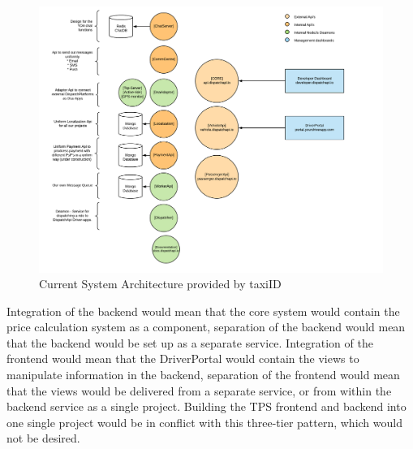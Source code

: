 \begin{figure}[htbp!]
	\centering
	\includegraphics[width=1\textwidth]{Architecture}
	\caption[Architecture]{Current System Architecture provided by taxiID}
	\label{fig:Architecture}
\end{figure}

Integration of the backend would mean that the core system would contain the price calculation system as a component, separation of the backend would mean that the backend would be set up as a separate service. Integration of the frontend would mean that the DriverPortal would contain the views to manipulate information in the backend, separation of the frontend would mean that the views would be delivered from a separate service, or from within the backend service as a single project. Building the TPS frontend and backend into one single project would be in conflict with this three-tier pattern, which would not be desired.

